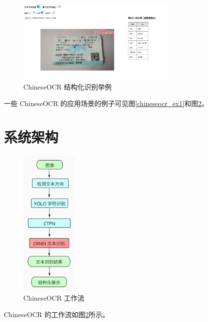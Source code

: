 \begin{figure}[h!]
	\centering
	\includegraphics[width=0.7\textwidth]{figure/resources/chineseocr_struct.png}
	\caption{ChineseOCR 结构化识别举例\label{chineseocr_structure}}
\end{figure}

一些 ChineseOCR 的应用场景的例子可见图\ref{chineseocr_ex1}和图\ref{chineseocr_structure}。

\section{系统架构}

\begin{figure}[h!]
	\centering
	\includegraphics[width=0.25\textwidth]{figure/resources/chineseocr.jpg}
	\caption{ChineseOCR 工作流\label{chineseocr_structure}}
\end{figure}

ChineseOCR 的工作流如图\ref{chineseocr_structure}所示。

